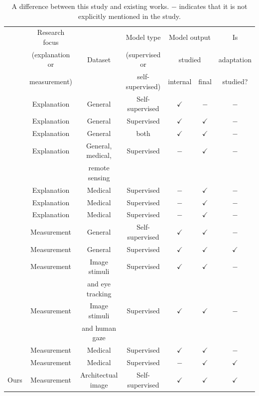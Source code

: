 \documentclass[lineno,pdflatex,sn-mathphys-num]{sn-jnl}%
\theoremstyle{thmstyleone}%
\theoremstyle{thmstyletwo}%
\theoremstyle{thmstylethree}%
\begin{document}
\begin{table}[!h]
\caption{A difference between this study and existing works. $-$ indicates that it is not explicitly mentioned in the study.\label{table review}}
\begin{tabular}{ccccccc}
\hline
 & Research focus  &  & Model type & \multicolumn{2}{c}{Model output}  & Is \\
 & (explanation or & Dataset & (supervised or & \multicolumn{2}{c}{ studied}  & adaptation \\
 &  measurement) &  & self-supervised) & internal & final &  studied? \\ \hline\hline
\cite{Kang20259339} & Explanation & General & Self-supervised & $\checkmark$ & $-$ & $-$ \\
\cite{Jo2025582} & Explanation & General & Supervised & $\checkmark$ & $\checkmark$ & $-$ \\
\cite{Liao2025PR} & Explanation & General & both & $\checkmark$ & $\checkmark$ & $-$ \\
\cite{Hanna25ICCV} & Explanation & General, medical, & Supervised & $-$ & $\checkmark$ & $-$ \\
 &  & remote sensing &   &  &  & \\
\cite{Cascone25ICCV} & Explanation & Medical & Supervised & $-$ & $\checkmark$ & $-$ \\
\cite{Hasannezhad2025} & Explanation & Medical & Supervised & $-$ & $\checkmark$ & $-$ \\
\cite{Velvizhi2026} & Explanation & Medical & Supervised & $-$ & $\checkmark$ & $-$ \\ \hline
\cite{park2023what} & Measurement & General & Self-supervised & $\checkmark$ & $\checkmark$ & $-$ \\
\cite{Walmer23CVPR} & Measurement & General & Supervised & $\checkmark$ & $\checkmark$ & $\checkmark$ \\
\cite{Carrasco2026} & Measurement & Image stimuli & Supervised & $\checkmark$ & $\checkmark$ & $-$ \\
 &  & and eye tracking &   &  &  & \\
\cite{Yamamoto2025} & Measurement & Image stimuli & Supervised & $\checkmark$ & $\checkmark$ & $-$ \\
 &  & and human gaze &   &  &  & \\
\cite{Cascone2026947} & Measurement & Medical & Supervised & $\checkmark$ & $\checkmark$ & $-$ \\
\cite{Chung2025110} & Measurement & Medical & Supervised & $-$ & $\checkmark$ & $\checkmark$ \\ \hline
Ours & Measurement & Architectual image & Self-supervised & $\checkmark$ & $\checkmark$ & $\checkmark$ \\ \hline
\end{tabular}
\end{table}
\end{document}
